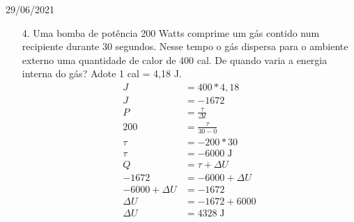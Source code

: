 \documentclass{SchoolBook}
\begin{document}
\begin{day}{29/06/2021}
\begin{enumerate}
            \item[4.] Uma bomba de potência 200 Watts comprime um gás contido num recipiente durante 30 segundos. Nesse tempo o gás dispersa para o ambiente externo uma quantidade de calor de 400 cal. De quando varia a energia interna do gás? Adote 1 cal = 4,18 J.
            \begin{align*}
                   J &= 400 * 4,18 \\
                   J &= -1672      \\[3pt]
                   P &= \frac{\tau}{\Delta t} \\
                 200 &= \frac{\tau}{30 - 0}   \\
                \tau &= -200 * 30             \\
                \tau &= -6000\;\si{\joule}    \\[3pt]
                   Q &= \tau + \Delta U  \\
                -1672 &= -6000 + \Delta U \\
                -6000 + \Delta U &= -1672 \\
                        \Delta U &= -1672 + 6000 \\
                        \Delta U &= 4328\;\si{\joule}
            \end{align*}
            

\end{enumerate}
\end{day}
\end{document}

